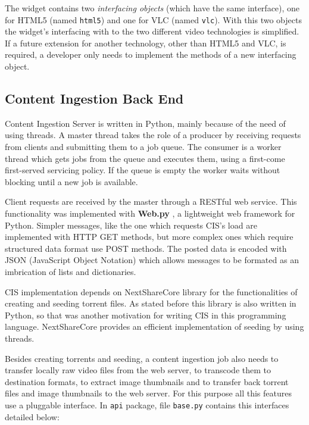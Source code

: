 The widget contains two \textit{interfacing objects} (which have the same interface), one for HTML5 (named \texttt{html5}) and one for VLC (named \texttt{vlc}). With this two objects the widget's interfacing with to the two different video technologies is simplified. If a future extension for another technology, other than HTML5 and VLC, is required, a developer only needs to implement the methods of a new interfacing object.

\subsection{Content Ingestion Back End}
\label{subsec:back-end}

Content Ingestion Server is written in Python, mainly because of the need of using threads. A master thread takes the role of a producer by receiving requests from clients and submitting them to a job queue. The consumer is a worker thread which gets jobs from the queue and executes them, using a first-come first-served servicing policy. If the queue is empty the worker waits without blocking until a new job is available. 

Client requests are received by the master through a RESTful web service. This functionality was implemented with \textbf{Web.py} \cite{webpy}, a lightweight web framework for Python. Simpler messages, like the one which requests CIS's load are implemented with HTTP GET methods, but more complex ones which require structured data format use POST methods. The posted data is encoded with JSON (JavaScript Object Notation) which allows messages to be formated as an imbrication of lists and dictionaries.

CIS implementation depends on NextShareCore library for the functionalities of creating and seeding torrent files. As stated before this library is also written in Python, so that was another motivation for writing CIS in this programming language. NextShareCore provides an efficient implementation of seeding by using threads.

Besides creating torrents and seeding, a content ingestion job also needs to transfer locally raw video files from the web server, to transcode them to destination formats, to extract image thumbnails and to transfer back torrent files and image thumbnails to the web server. For this purpose all this features use a pluggable interface. In \texttt{api} package, file \texttt{base.py} contains this interfaces detailed below:

